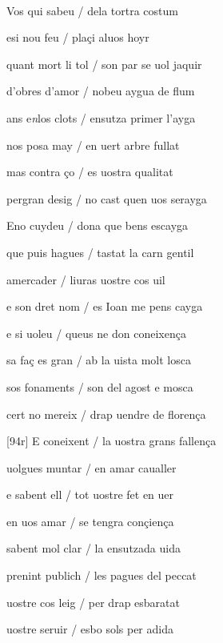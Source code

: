 \documentclass[12pt]{article}
\renewcommand{\espaiAbansEtiquetaPoema}{\vspace{0ex}}
\begin{document}
\begin{estrofa}

\espaiAbansEtiquetaPoema

\\

\end{estrofa}


\begin{estrofa}

 Vos qui sabeu / dela tortra costum

 esi nou feu / pla\c{c}i aluos hoyr

 quant mort li tol / son par se uol jaquir

 d'obres d'amor / nobeu aygua de flum

 ans e\textit{n}los clots / ensutza primer l'ayga

 nos posa may / en uert arbre fullat

 mas contra \c{c}o / es uostra qualitat

 pergran desig / no cast quen uos serayga

\end{estrofa}



\begin{estrofa}

 Eno cuydeu / dona que bens escayga

 que puis hagues / tastat la carn gentil

 amercader / liuras uostre cos uil

 e son dret nom / es Ioan me pens cayga

 e si uoleu / queus ne don coneixen\c{c}a

 sa fa\c{c} es gran / ab la uista molt losca

 sos fonaments / son del agost e mosca

 cert no mereix / drap uendre de floren\c{c}a

\end{estrofa}



\begin{estrofa}

 [94r] E coneixent / la uostra grans fallen\c{c}a

 uolgues muntar / en amar caualler

 e sabent ell / tot uostre fet en uer

 en uos amar / se tengra con\c{c}ien\c{c}a

 sabent mol clar / la ensutzada uida

 prenint publich / les pagues del peccat

 uostre cos leig / per drap esbaratat

 uostre seruir / esbo sols per adida

\end{estrofa}
\end{document}
